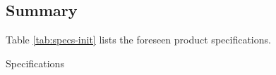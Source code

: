 \subsection{Summary}
\label{sec:org1f95256}
Table \ref{tab:specs-init} lists the foreseen product specifications.

\begin{table}[!hbt]
\centering
\caption{Specifications}
\label{tab:specs-init}


\end{table}
